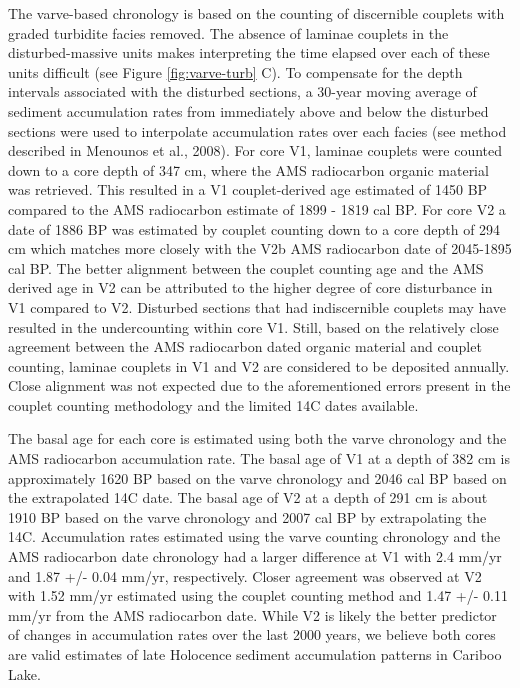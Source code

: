 \documentclass[Royal,times,doublespace,sageh]{sagej}
\begin{document}
The varve-based chronology is based on the counting of discernible
couplets with graded turbidite facies removed. The absence of laminae
couplets in the disturbed-massive units makes interpreting the time
elapsed over each of these units difficult (see Figure
\ref{fig:varve-turb} C). To compensate for the depth intervals
associated with the disturbed sections, a 30-year moving average of
sediment accumulation rates from immediately above and below the
disturbed sections were used to interpolate accumulation rates over each
facies (see method described in Menounos et al., 2008). For core V1,
laminae couplets were counted down to a core depth of 347 cm, where the
AMS radiocarbon organic material was retrieved. This resulted in a V1
couplet-derived age estimated of 1450 BP compared to the AMS radiocarbon
estimate of 1899 - 1819 cal BP. For core V2 a date of 1886 BP was
estimated by couplet counting down to a core depth of 294 cm which
matches more closely with the V2b AMS radiocarbon date of 2045-1895 cal
BP. The better alignment between the couplet counting age and the AMS
derived age in V2 can be attributed to the higher degree of core
disturbance in V1 compared to V2. Disturbed sections that had
indiscernible couplets may have resulted in the undercounting within
core V1. Still, based on the relatively close agreement between the AMS
radiocarbon dated organic material and couplet counting, laminae
couplets in V1 and V2 are considered to be deposited annually. Close
alignment was not expected due to the aforementioned errors present in
the couplet counting methodology and the limited 14C dates available.

The basal age for each core is estimated using both the varve chronology
and the AMS radiocarbon accumulation rate. The basal age of V1 at a
depth of 382 cm is approximately 1620 BP based on the varve chronology
and 2046 cal BP based on the extrapolated 14C date. The basal age of V2
at a depth of 291 cm is about 1910 BP based on the varve chronology and
2007 cal BP by extrapolating the 14C. Accumulation rates estimated using
the varve counting chronology and the AMS radiocarbon date chronology
had a larger difference at V1 with 2.4 mm/yr and 1.87 +/- 0.04 mm/yr,
respectively. Closer agreement was observed at V2 with 1.52 mm/yr
estimated using the couplet counting method and 1.47 +/- 0.11 mm/yr from
the AMS radiocarbon date. While V2 is likely the better predictor of
changes in accumulation rates over the last 2000 years, we believe both
cores are valid estimates of late Holocence sediment accumulation
patterns in Cariboo Lake.
\end{document}
